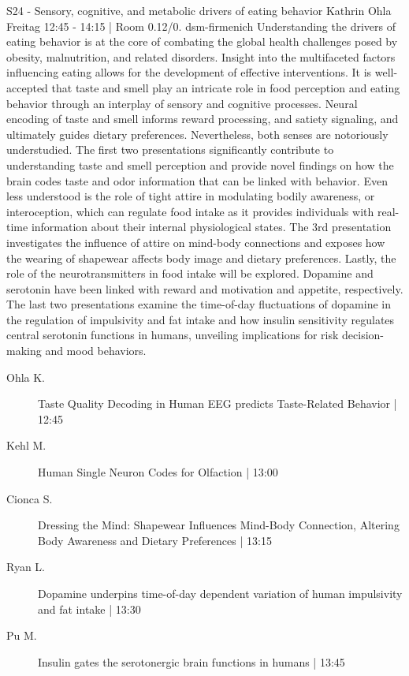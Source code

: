 
            \begin{symposium}
            {S24 - Sensory, cognitive, and metabolic drivers of eating behavior}
            {Kathrin Ohla}
            {Freitag 12:45 - 14:15 | Room 0.12/0.}
            {dsm-firmenich}
            Understanding the drivers of eating behavior is at the core of combating the global health challenges posed by obesity, malnutrition, and related disorders. Insight into the multifaceted factors influencing eating allows for the development of effective interventions. It is well-accepted that taste and smell play an intricate role in food perception and eating behavior through an interplay of sensory and cognitive processes. Neural encoding of taste and smell informs reward processing, and satiety signaling, and ultimately guides dietary preferences. Nevertheless, both senses are notoriously understudied. The first two presentations significantly contribute to understanding taste and smell perception and provide novel findings on how the brain codes taste and odor information that can be linked with behavior.
Even less understood is the role of tight attire in modulating bodily awareness, or interoception, which can regulate food intake as it provides individuals with real-time information about their internal physiological states. The 3rd presentation investigates the influence of attire on mind-body connections and exposes how the wearing of shapewear affects body image and dietary preferences. Lastly, the role of the neurotransmitters in food intake will be explored. Dopamine and serotonin have been linked with reward and motivation and appetite, respectively. The last two presentations examine the time-of-day fluctuations of dopamine in the regulation of impulsivity and fat intake and how insulin sensitivity regulates central serotonin functions in humans, unveiling implications for risk decision-making and mood behaviors.
            \begin{description}    
            
                \item [ Ohla K.] Taste Quality Decoding in Human EEG predicts Taste-Related Behavior \textcolor{mygray}{ | 12:45}    
                
                \item [ Kehl M.] Human Single Neuron Codes for Olfaction \textcolor{mygray}{ | 13:00}    
                
                \item [ Cionca S.] Dressing the Mind: Shapewear Influences Mind-Body Connection, Altering Body Awareness and Dietary Preferences \textcolor{mygray}{ | 13:15}    
                
                \item [ Ryan L.] Dopamine underpins time-of-day dependent variation of human impulsivity and fat intake \textcolor{mygray}{ | 13:30}    
                
                \item [ Pu M.] Insulin gates the serotonergic brain functions in humans \textcolor{mygray}{ | 13:45}    
                
            \end{description} 
            \end{symposium}
            